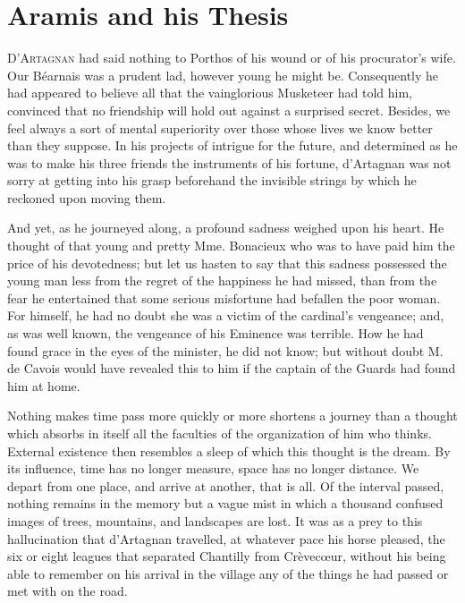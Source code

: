 
\chapter{Aramis and his Thesis} 
	
\lettrine[]{D}{'Artagnan} had said nothing to Porthos of his wound or of his procurator's wife. Our Béarnais was a prudent lad, however young he might be. Consequently he had appeared to believe all that the vainglorious Musketeer had told him, convinced that no friendship will hold out against a surprised secret. Besides, we feel always a sort of mental superiority over those whose lives we know better than they suppose. In his projects of intrigue for the future, and determined as he was to make his three friends the instruments of his fortune, d'Artagnan was not sorry at getting into his grasp beforehand the invisible strings by which he reckoned upon moving them. 

And yet, as he journeyed along, a profound sadness weighed upon his heart. He thought of that young and pretty Mme. Bonacieux who was to have paid him the price of his devotedness; but let us hasten to say that this sadness possessed the young man less from the regret of the happiness he had missed, than from the fear he entertained that some serious misfortune had befallen the poor woman. For himself, he had no doubt she was a victim of the cardinal's vengeance; and, as was well known, the vengeance of his Eminence was terrible. How he had found grace in the eyes of the minister, he did not know; but without doubt M. de Cavois would have revealed this to him if the captain of the Guards had found him at home. 

Nothing makes time pass more quickly or more shortens a journey than a thought which absorbs in itself all the faculties of the organization of him who thinks. External existence then resembles a sleep of which this thought is the dream. By its influence, time has no longer measure, space has no longer distance. We depart from one place, and arrive at another, that is all. Of the interval passed, nothing remains in the memory but a vague mist in which a thousand confused images of trees, mountains, and landscapes are lost. It was as a prey to this hallucination that d'Artagnan travelled, at whatever pace his horse pleased, the six or eight leagues that separated Chantilly from Crèvecœur, without his being able to remember on his arrival in the village any of the things he had passed or met with on the road. 

